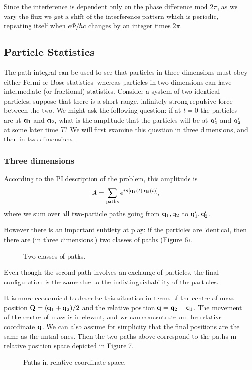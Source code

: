 \documentclass[12pt]{article}
\begin{document}
Since the interference is dependent only on the phase difference mod
$2\pi$, as we vary the flux we get a shift of the interference pattern
which is periodic, repeating itself when $e\Phi/\hbar c$ changes by an
integer times $2\pi$.


\subsection{Particle Statistics}

The path integral can be used to see that particles in three
dimensions
must obey either
Fermi or Bose statistics, whereas particles in two dimensions can
have intermediate (or fractional) statistics. Consider a system of two
identical particles; suppose that there is a short range, infinitely
strong repulsive force between the two. We might ask the following
question: if at $t=0$ the particles are at ${\mathbf q}_1$ and ${\mathbf q}_2$, what
is the amplitude that the particles will be at ${\mathbf q}_1'$ and 
${\mathbf q}_2'$ at some later time $T$? We will first examine this question
in three dimensions, and then in two dimensions.

\subsubsection{Three dimensions}

According to the PI description of the problem, this amplitude is
\[ A=\sum_{\mathrm{paths}}e^{iS[{\mathbf q}_1(t),{\mathbf q}_2(t)]},
\]
where we sum over all two-particle paths going from ${\mathbf q}_1,{\mathbf q}_2$ to
${\mathbf q}_1',{\mathbf q}_2'$.

However there is an important subtlety at play: if the particles are
identical, then there are (in three dimensions!) two classes of paths
(Figure 6).
\begin{figure}[ht]
\epsfysize=4cm
\centerline{}
\caption{Two classes of paths.}
\end{figure}

Even though the second path involves an exchange of particles, the
final configuration is the same due to the indistinguishability of the
particles.

It is more economical to describe this situation in terms of the
centre-of-mass position ${\mathbf Q}=({\mathbf q}_1+{\mathbf q}_2)/2$ and the relative
position ${\mathbf q}={\mathbf q}_2-{\mathbf q}_1$. The movement of the centre of mass is
irrelevant, and we can concentrate on the relative coordinate
${\mathbf q}$. We can also assume for simplicity that the final positions are
the same as the initial ones. Then the two paths above correspond to
the paths in relative position space depicted in Figure 7.
\begin{figure}[ht]
\epsfysize=5cm
\centerline{}
\caption{Paths in relative coordinate space.}
\end{figure}
\end{document}

